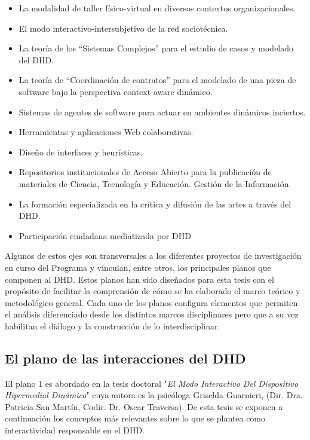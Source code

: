 \begin{itemize}
\item La modalidad de taller físico-virtual en diversos contextos
organizacionales.
\item El modo interactivo-intersubjetivo de la red sociotécnica.
\item La teoría de los “Sistemas Complejos” para el estudio de casos y modelado
del DHD.
\item La teoría de “Coordinación de contratos” para el modelado de una pieza de
software bajo la perspectiva context-aware dinámico.
\item Sistemas de agentes de software para actuar en ambientes dinámicos
inciertos.
\item Herramientas y aplicaciones Web colaborativas.
\item Diseño de interfaces y heurísticas.
\item Repositorios institucionales de Acceso Abierto para la publicación de
materiales de Ciencia, Tecnología y Educación. Gestión de la Información.
\item La formación especializada en la crítica y difusión de las artes a través
del DHD.
\item Participación ciudadana mediatizada por DHD
\end{itemize}


Algunos de estos ejes son transversales a los diferentes proyectos de investigación en curso del Programa y vinculan,
entre otros, los principales planos que componen al DHD. Estos planos han sido diseñados para esta tesis con el propósito de facilitar la comprensión de cómo se ha elaborado el marco teórico y metodológico general. Cada uno de los planos configura
elementos que permiten el análisis diferenciado desde los distintos marcos disciplinares pero que a su vez habilitan el diálogo y la construcción de lo interdisciplinar. 

\subsection{El plano de las interacciones del DHD} \label{interacciones}

El plano 1 es abordado en la tesis doctoral "\textit{El Modo Interactivo Del
Dispositivo Hipermedial Dinámico}" cuya autora es la psicóloga Griselda Guarnieri,
(Dir. Dra. Patricia San Martín, Codir. Dr. Oscar Traversa). De esta tesis
se exponen a continuación los conceptos más relevantes sobre lo que se plantea
como interactividad responsable en el DHD.

